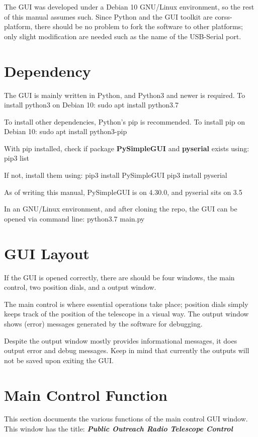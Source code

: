 \documentclass{article}
\begin{document}
The GUI was developed under a Debian 10 GNU/Linux environment, so the rest of this manual assumes such. Since Python and the GUI toolkit are corss-platform, there should be no problem to fork the software to other platforms; only slight modification are needed such as the name of the USB-Serial port.

\section{Dependency}

The GUI is mainly written in Python, and Python3 and newer is required. To install python3 on Debian 10:
sudo apt install python3.7

To install other dependencies, Python's pip is recommended. To install pip on Debian 10:
sudo apt install python3-pip

With pip installed, check if package \textbf{PySimpleGUI} and \textbf{pyserial} exists using:
pip3 list

If not, install them using:
pip3 install PySimpleGUI
pip3 install pyserial

As of writing this manual, PySimpleGUI is on 4.30.0, and pyserial sits on 3.5

In an GNU/Linux environment, and after cloning the repo, the GUI can be opened via command line: python3.7 main.py

\section{GUI Layout}

If the GUI is opened correctly, there are should be four windows, the main control, two position dials, and a output window.

The main control is where essential operations take place; position dials simply keeps track of the position of the telescope in a visual way. The output window shows (error) messages generated by the software for debugging.

Despite the output window mostly provides informational messages, it does output error and debug messages. Keep in mind that currently the outputs will not be saved upon exiting the GUI.


\section{Main Control Function}
This section documents the various functions of the main control GUI window. This window has the title: \textbf{\textit{Public Outreach Radio Telescope Control}}
\end{document}
